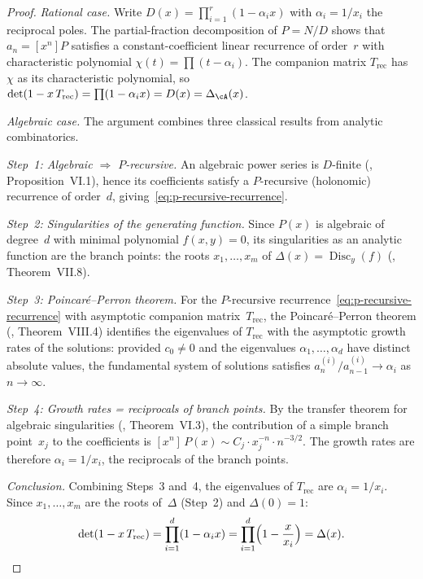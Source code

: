 \begin{proof}
\emph{Rational case.}
Write $D(x) = \prod_{i=1}^{r}(1 - \alpha_i x)$ with
$\alpha_i = 1/x_i$ the reciprocal poles.
The partial-fraction decomposition of
$P = N/D$ shows that $a_n = [x^n]P$ satisfies a
constant-coefficient linear recurrence of order~$r$
with characteristic polynomial
$\chi(t) = \prod(t - \alpha_i)$.
The companion matrix $T_{\mathrm{rec}}$ has $\chi$ as
its characteristic polynomial, so
$\det(1 - x\,T_{\mathrm{rec}}) = \prod(1 - \alpha_i x)
= D(x) = \Delta_{\cA}(x)$.

\emph{Algebraic case.}
The argument combines three classical results from analytic
combinatorics.

\emph{Step~1: Algebraic $\Rightarrow$ $P$-recursive.}
An algebraic power series is $D$-finite
(\cite{FlajoletSedgewick}, Proposition~VI.1), hence its
coefficients satisfy a $P$-recursive (holonomic) recurrence
of order~$d$, giving~\eqref{eq:p-recursive-recurrence}.

\emph{Step~2: Singularities of the generating function.}
Since $P(x)$ is algebraic of degree~$d$ with minimal polynomial
$f(x,y) = 0$, its singularities as an analytic function are
the branch points: the roots $x_1, \ldots, x_m$ of
$\Delta(x) = \operatorname{Disc}_y(f)$
(\cite{FlajoletSedgewick}, Theorem~VII.8).

\emph{Step~3: Poincar\'e--Perron theorem.}
For the $P$-recursive recurrence~\eqref{eq:p-recursive-recurrence}
with asymptotic companion matrix~$T_{\mathrm{rec}}$, the
Poincar\'e--Perron theorem
(\cite{FlajoletSedgewick}, Theorem~VIII.4)
identifies the eigenvalues of $T_{\mathrm{rec}}$ with the
asymptotic growth rates of the solutions: provided
$c_0 \neq 0$ and the eigenvalues $\alpha_1, \ldots, \alpha_d$
have distinct absolute values, the fundamental system of
solutions satisfies
$a_n^{(i)}/a_{n-1}^{(i)} \to \alpha_i$ as $n \to \infty$.

\emph{Step~4: Growth rates = reciprocals of branch points.}
By the transfer theorem for algebraic singularities
(\cite{FlajoletSedgewick}, Theorem~VI.3), the contribution
of a simple branch point~$x_j$ to the coefficients is
$[x^n]\, P(x) \sim C_j \cdot x_j^{-n} \cdot n^{-3/2}$.
The growth rates are therefore $\alpha_i = 1/x_i$, the
reciprocals of the branch points.

\emph{Conclusion.}
Combining Steps~3 and~4, the eigenvalues of $T_{\mathrm{rec}}$
are $\alpha_i = 1/x_i$. Since $x_1, \ldots, x_m$ are the
roots of~$\Delta$ (Step~2) and $\Delta(0) = 1$:
\[
\det(1 - x\, T_{\mathrm{rec}})
= \prod_{i=1}^d (1 - \alpha_i x)
= \prod_{i=1}^d \Bigl(1 - \frac{x}{x_i}\Bigr)
= \Delta(x). \qedhere
\]
\end{proof}

